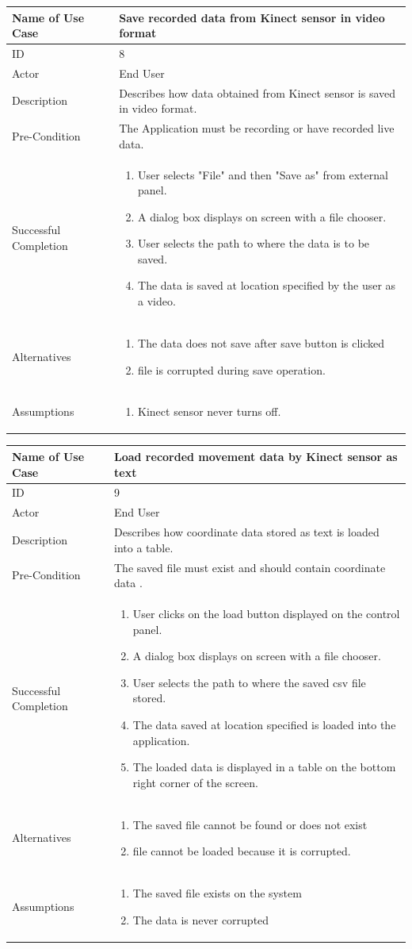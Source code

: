 \documentclass[a4paper, 12pt]{article}
\newcommand\addrow[2]{#1 &#2\\ }
\newcommand\addheading[2]{#1 &#2\\ \hline}
\newcommand\tabularhead{\begin{tabular}{lp{8cm}}
\hline
}
\newcommand\addmulrow[2]{ \begin{minipage}[t][][t]{2.5cm}#1\end{minipage}%
   &\begin{minipage}[t][][t]{8cm}
    \begin{enumerate} #2   \end{enumerate}
    \end{minipage}\\ }
\newenvironment{usecase}{\tabularhead}
{\hline\end{tabular}}
\begin{document}
\begin{usecase}
	\addheading{Name of Use Case}{Save recorded data from Kinect sensor in video format }
	\addrow{ID}{8}
	\addrow{Actor}{End User}
	\addrow{Description}{Describes how data obtained from Kinect sensor is saved in video format.}
	\addrow{Pre-Condition}{The Application must be recording or have recorded live data.}
	\addmulrow{Successful Completion}{
		\item User selects "File" and then "Save as" from external panel. 
		\item A dialog box displays on screen with a file chooser. 
		\item User selects the path to where the data is to be saved.
		\item The data is saved at location specified by the user as a video.}
	\addmulrow{Alternatives}{ 
	\item The data does not save after save button is clicked 
	\item file is corrupted during save operation.}
	\addmulrow{Assumptions}{
	\item Kinect sensor never turns off. }
\end{usecase}

\begin{usecase}
	\addheading{Name of Use Case}{Load recorded movement data by Kinect sensor as text }
	\addrow{ID}{9}
	\addrow{Actor}{End User}
	\addrow{Description}{Describes how coordinate data stored as text is loaded into a table.}
	\addrow{Pre-Condition}{The saved file must exist and should contain coordinate data .}
	\addmulrow{Successful Completion}{
		\item User clicks on the load button displayed on the control panel. 
		\item A dialog box displays on screen with a file chooser. 
		\item User selects the path to where the saved csv file stored.
		\item The data saved at location specified is loaded into the application.
		\item The loaded data is displayed in a table on the bottom right corner of the screen.}
	\addmulrow{Alternatives}{ 
	\item The saved file cannot be found or does not exist 
	\item file cannot be loaded because it is corrupted.}
	\addmulrow{Assumptions}{
	\item The saved file exists on the system 
	\item The data is never corrupted}
\end{usecase}
\end{document}

